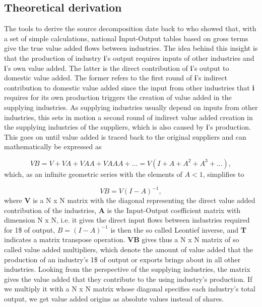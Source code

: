 \documentclass[a4paper]{article}\usepackage[]{graphicx}\usepackage[]{color}
\begin{document}
\subsection{Theoretical derivation}
The tools to derive the source decomposition date back to \citet{wale36} who showed that, with a set of simple calculations, 
national Input-Output tables based on gross terms give the true value added flows between industries. 
The idea behind this insight is that the production of industry \textbf{i}'s output requires inputs of other industries 
and \textbf{i}'s own value added.
The latter is the direct contribution of \textbf{i}'s output to domestic value added. 
The former refers to the first round of \textbf{i}'s indirect contribution to domestic value added since the input from 
other industries that \textbf{i} requires for its own production triggers the creation of value added in the supplying 
industries.
As supplying industries usually depend on inputs from other industries, this sets in motion a second round 
of indirect value added creation in the supplying industries of the suppliers, which is also caused by \textbf{i}'s production. 
This goes on until value added is traced back to the original suppliers and can mathematically be expressed as 

\begin{equation}
VB = V + VA + VAA + VAAA + ... = V (I+A+A^{2}+A^{3}+...),
\end{equation}
which, as an infinite geometric series with the elements of $A<1$, simplifies to

\begin{equation}
VB = V (I-A)^{-1},
\end{equation}
where \textbf{V} is a N x N matrix with the diagonal representing the direct value added contribution of the industries,
\textbf{A} is the Input-Output coefficient matrix with dimension N x N, i.e. it gives the direct input flows between
industries required for 1\$ of output, $B = (I-A)^{-1}$ is then the so called Leontief inverse, and \textbf{T} indicates
a matrix transpose operation.
\textbf{VB} gives thus a N x N matrix of so called value added multipliers, which denote the amount of value added that the production of an industry's 1\$ of output or exports brings about in all other industries.
Looking from the perspective of the supplying industries, the matrix gives the value added that they contribute to the using industry's production.
If we multiply it with a N x N matrix whose diagonal specifies each industry's total output, we get value added origins as absolute values instead of shares.
\end{document}
